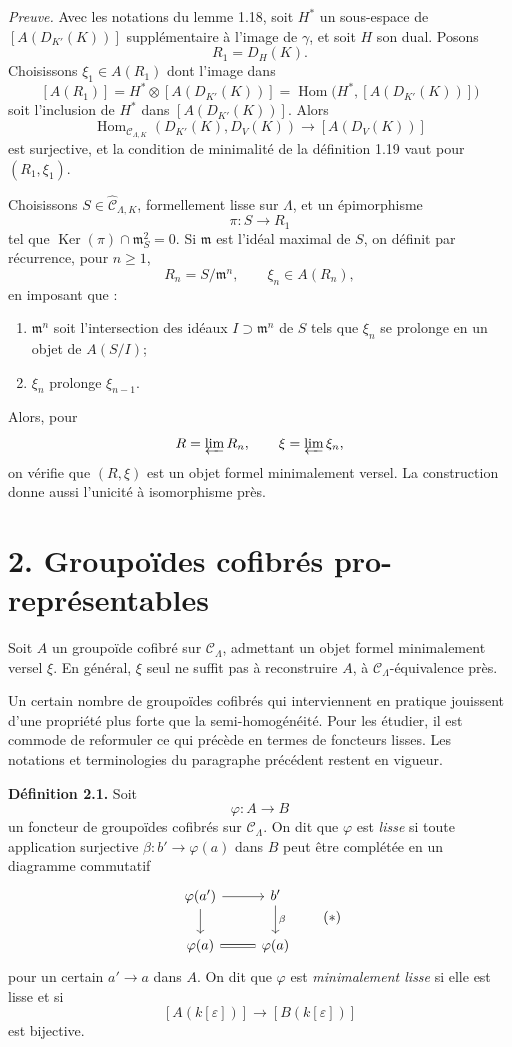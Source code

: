 \documentclass[11pt]{article}
\providecommand{\Ker}{\operatorname{Ker}}
\providecommand{\Hom}{\operatorname{Hom}}
\begin{document}
\emph{Preuve.} Avec les notations du lemme 1.18, soit \(H^\ast\) un sous-espace de
\([A(D_{K'}(K))]\) suppl\'ementaire \`a l'image de \(\gamma\), et soit \(H\) son dual.
Posons
\[
 R_1=D_H(K).
\]
Choisissons \(\xi_1\in A(R_1)\) dont l'image dans
\[
 [A(R_1)]=H^\ast\otimes[A(D_{K'}(K))]
 =\Hom\bigl(H^\ast,[A(D_{K'}(K))]\bigr)
\]
soit l'inclusion de \(H^\ast\) dans \([A(D_{K'}(K))]\). Alors
\[
 \Hom_{\mathcal C_{\Lambda,K}}(D_{K'}(K),D_V(K))
 \longrightarrow [A(D_V(K))]
\]
est surjective, et la condition de minimalit\'e de la d\'efinition 1.19 vaut pour
\((R_1,\xi_1)\).

Choisissons \(S\in\widehat{\mathcal C}_{\Lambda,K}\), formellement lisse sur \(\Lambda\),
et un \'epimorphisme
\[
 \pi:S\longrightarrow R_1
\]
tel que \(\Ker(\pi)\cap\mathfrak m_S^2=0\). Si \(\mathfrak m\) est l'id\'eal maximal
de \(S\), on d\'efinit par r\'ecurrence, pour \(n\geq1\),
\[
 R_n=S/\mathfrak m^n,\qquad \xi_n\in A(R_n),
\]
en imposant que :
\begin{enumerate}[label=(\alph*)]
\item \(\mathfrak m^n\) soit l'intersection des id\'eaux \(I\supset\mathfrak m^n\) de \(S\)
tels que \(\xi_n\) se prolonge en un objet de \(A(S/I)\);
\item \(\xi_n\) prolonge \(\xi_{n-1}\).
\end{enumerate}
Alors, pour
\[
 R=\varprojlim R_n,\qquad \xi=\varprojlim \xi_n,
\]
on v\'erifie que \((R,\xi)\) est un objet formel minimalement versel. La construction donne
aussi l'unicit\'e \`a isomorphisme pr\`es.

\section*{2. Groupo\"ides cofibr\'es pro-repr\'esentables}

Soit \(A\) un groupo\"ide cofibr\'e sur \(\mathcal C_\Lambda\), admettant un objet formel
minimalement versel \(\xi\). En g\'en\'eral, \(\xi\) seul ne suffit pas \`a reconstruire
\(A\), \`a \(\mathcal C_\Lambda\)-\'equivalence pr\`es.

Un certain nombre de groupo\"ides cofibr\'es qui interviennent en pratique jouissent d'une
propri\'et\'e plus forte que la semi-homog\'en\'eit\'e. Pour les \'etudier, il est commode de
reformuler ce qui pr\'ec\`ede en termes de foncteurs lisses. Les notations et terminologies
du paragraphe pr\'ec\'edent restent en vigueur.

\textbf{D\'efinition 2.1.} Soit
\[
 \varphi:A\longrightarrow B
\]
un foncteur de groupo\"ides cofibr\'es sur \(\mathcal C_\Lambda\). On dit que \(\varphi\)
est \emph{lisse} si toute application surjective
\(\beta:b'\to\varphi(a)\) dans \(B\) peut \^etre compl\'et\'ee en un diagramme commutatif
\[
\begin{tikzcd}
\varphi(a') \arrow[r] \arrow[d] & b' \arrow[d,"\beta"]\\
\varphi(a) \arrow[r,equal] & \varphi(a)
\end{tikzcd}
\tag{\(*\)}
\]
pour un certain \(a'\to a\) dans \(A\). On dit que \(\varphi\) est
\emph{minimalement lisse} si elle est lisse et si
\[
 [A(k[\varepsilon])]\longrightarrow [B(k[\varepsilon])]
\]
est bijective.
\end{document}
